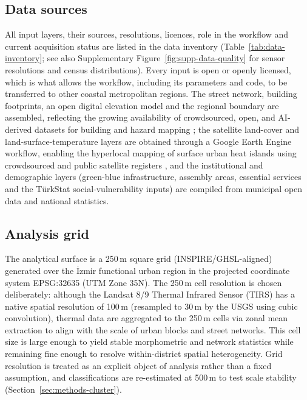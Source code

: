 \FloatBarrier
\subsection{Data sources}
\label{sec:data}
All input layers, their sources, resolutions, licences, role in the workflow and
current acquisition status are listed in the data inventory
(Table~\ref{tab:data-inventory}; see also Supplementary Figure~\ref{fig:supp-data-quality} for sensor resolutions and census distributions). Every input is open or openly licensed, which is
what allows the workflow, including its parameters and code, to be transferred to
other coastal metropolitan regions. The street network, building footprints, an
open digital elevation model and the regional boundary are assembled, reflecting the
growing availability of crowdsourced, open, and AI-derived datasets for building and
hazard mapping \citep{bhuyan2023MappingCharacte}; the satellite land-cover and
land-surface-temperature layers are obtained through a Google Earth Engine workflow,
enabling the hyperlocal mapping of surface urban heat islands using crowdsourced and
public satellite registers \citep{venter2020HyperlocMapping}, and the institutional
and demographic layers (green-blue infrastructure, assembly areas, essential services
and the T\"urkStat social-vulnerability inputs) are compiled from municipal open data
and national statistics.



\subsection{Analysis grid}
\label{sec:methods-grid}
The analytical surface is a 250\,m square grid (INSPIRE/GHSL-aligned) generated over the
\.{I}zmir functional urban region in the projected coordinate system EPSG:32635 (UTM Zone 35N).
The 250\,m cell resolution is chosen deliberately: although the Landsat 8/9 Thermal Infrared Sensor (TIRS) has a native spatial resolution of 100\,m (resampled to 30\,m by the USGS using cubic convolution), thermal data are aggregated to the 250\,m cells via zonal mean extraction to align with the scale of urban blocks and street networks. This cell size is large enough to yield stable morphometric and network statistics while remaining fine enough to resolve within-district spatial heterogeneity. Grid resolution is treated as an explicit object of analysis rather than a fixed assumption, and classifications are re-estimated at 500\,m to test scale stability (Section~\ref{sec:methods-cluster}).


